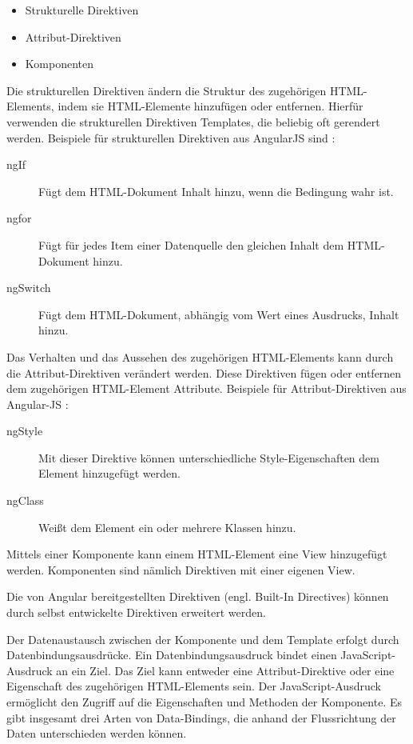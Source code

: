 \begin{itemize}
	\item Strukturelle Direktiven 
	\item Attribut-Direktiven
	\item Komponenten
\end{itemize}

Die strukturellen Direktiven ändern die Struktur des zugehörigen HTML-Elements, indem sie HTML-Elemente hinzufügen oder entfernen. Hierfür verwenden die strukturellen Direktiven Templates, die beliebig oft gerendert werden. \autocites[vgl.][269\psqq]{Steyer.2017}[vgl.][365]{Freeman.2018} Beispiele für strukturellen Direktiven aus AngularJS sind \autocite[vgl.][261\psqq]{Freeman.2018}:
\begin{description}
	\item [ngIf] Fügt dem HTML-Dokument Inhalt hinzu, wenn die Bedingung wahr ist. 
	\item [ngfor] Fügt für jedes Item einer Datenquelle den gleichen Inhalt dem HTML-Dokument hinzu.
	\item [ngSwitch] Fügt dem HTML-Dokument, abhängig vom Wert eines Ausdrucks, Inhalt hinzu.
\end{description} 

Das Verhalten und das Aussehen des zugehörigen HTML-Elements kann durch die Attribut-Direktiven verändert werden. Diese Direktiven fügen oder entfernen dem zugehörigen HTML-Element Attribute. \autocite[vgl.][339]{Freeman.2018} Beispiele für Attribut-Direktiven aus Angular-JS \autocite[vgl.][249\psqq]{Freeman.2018}:
\begin{description}
	\item [ngStyle] Mit dieser Direktive können unterschiedliche Style-Eigenschaften dem Element hinzugefügt werden.
	\item [ngClass] Weißt dem Element ein oder mehrere Klassen hinzu. 
\end{description}

Mittels einer Komponente kann einem HTML-Element eine View hinzugefügt werden. Komponenten sind nämlich Direktiven mit einer eigenen View. \autocites[vgl.][265]{Steyer.2017}

Die von Angular bereitgestellten Direktiven (engl. Built-In Directives) können durch selbst entwickelte Direktiven erweitert werden. \autocite[vgl.][261]{Freeman.2018}

Der Datenaustausch zwischen der Komponente und dem Template erfolgt durch Datenbindungsausdrücke. Ein Datenbindungsausdruck bindet einen JavaScript-Ausdruck an ein Ziel. Das Ziel kann entweder eine Attribut-Direktive oder eine Eigenschaft des zugehörigen HTML-Elements sein. Der JavaScript-Ausdruck ermöglicht den Zugriff auf die Eigenschaften und Methoden der Komponente. \autocites[vgl.][237\psqq]{Freeman.2018}[vgl.][52\psq]{Steyer.2017} [vgl.][]{Google.d} Es gibt insgesamt drei Arten von Data-Bindings, die anhand der Flussrichtung der Daten unterschieden werden können. 

